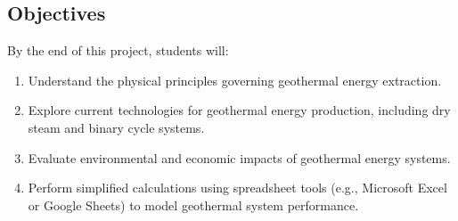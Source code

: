 \documentclass[letterpaper,10pt,english]{jupyterBook}
\begin{document}
\subsection{Objectives}
\label{\detokenize{ProjectInstructions:id36}}
\sphinxAtStartPar
By the end of this project, students will:
\begin{enumerate}
%
\item {} 
\sphinxAtStartPar
Understand the physical principles governing geothermal energy extraction.

\item {} 
\sphinxAtStartPar
Explore current technologies for geothermal energy production, including dry steam and binary cycle systems.

\item {} 
\sphinxAtStartPar
Evaluate environmental and economic impacts of geothermal energy systems.

\item {} 
\sphinxAtStartPar
Perform simplified calculations using spreadsheet tools (e.g., Microsoft Excel or Google Sheets) to model geothermal system performance.

\end{enumerate}
\end{document}
